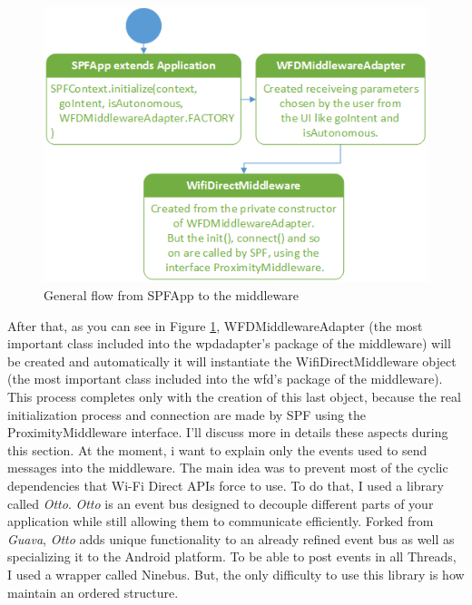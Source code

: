 \begin{figure}[thpb]
	\centering
	\includegraphics[scale=0.5]{./images/chap2/uml-parte0-1.png}
	\caption{General flow from SPFApp to the middleware}
	\label{uml-part0-1}
\end{figure}	

After that, as you can see in Figure \ref{uml-part0-1}, \textsf{WFDMiddlewareAdapter} (the most important class included into the \textsf{wpdadapter}'s package of the middleware) will be created and automatically it will instantiate the \textsf{WifiDirectMiddleware} object (the most important class included into the \textsf{wfd}'s package of the middleware). This process completes only with the creation of this last object, because the real initialization process and connection are made by SPF using the \textsf{ProximityMiddleware} interface. I'll discuss more in details these aspects during this section.
At the moment, i want to explain only the events used to send messages into the middleware. The main idea was to prevent most of the cyclic dependencies that Wi-Fi Direct APIs force to use. To do that, I used a library called \emph{Otto}. 
\emph{Otto} is an event bus designed to decouple different parts of your application while still allowing them to communicate efficiently. Forked from \emph{Guava}, \emph{Otto} adds unique functionality to an already refined event bus as well as specializing it to the Android platform.
To be able to post events in all Threads, I used a wrapper called \textsf{Ninebus}. But, the only difficulty to use this library is how maintain an ordered structure. 

